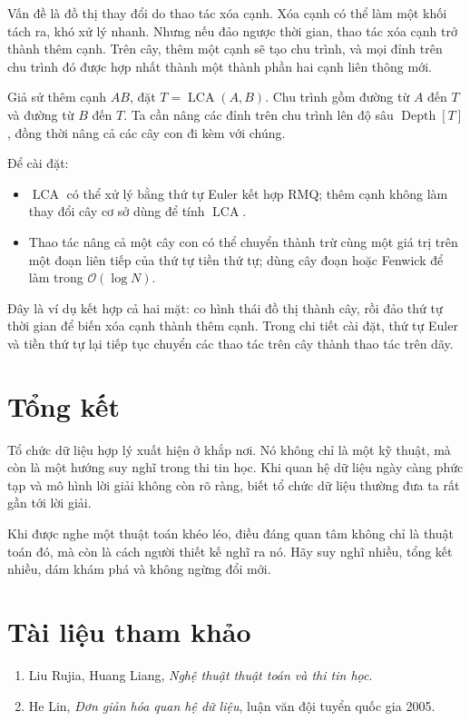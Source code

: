 \documentclass[11pt]{article}
\newcommand{\Oh}{\mathcal{O}}
\newcommand{\LCA}{\operatorname{LCA}}
\newcommand{\Depth}{\operatorname{Depth}}
\begin{document}
Vấn đề là đồ thị thay đổi do thao tác xóa cạnh. Xóa cạnh có thể làm một khối
tách ra, khó xử lý nhanh. Nhưng nếu đảo ngược thời gian, thao tác xóa cạnh
trở thành thêm cạnh. Trên cây, thêm một cạnh sẽ tạo chu trình, và mọi đỉnh trên
chu trình đó được hợp nhất thành một thành phần hai cạnh liên thông mới.

Giả sử thêm cạnh \(AB\), đặt \(T=\LCA(A,B)\). Chu trình gồm đường từ \(A\) đến
\(T\) và đường từ \(B\) đến \(T\). Ta cần nâng các đỉnh trên chu trình lên độ
sâu \(\Depth[T]\), đồng thời nâng cả các cây con đi kèm với chúng.

Để cài đặt:
\begin{itemize}
  \item \(\LCA\) có thể xử lý bằng thứ tự Euler kết hợp RMQ; thêm cạnh không
  làm thay đổi cây cơ sở dùng để tính \(\LCA\).
  \item Thao tác nâng cả một cây con có thể chuyển thành trừ cùng một giá trị
  trên một đoạn liên tiếp của thứ tự tiền thứ tự; dùng cây đoạn hoặc Fenwick để
  làm trong \(\Oh(\log N)\).
\end{itemize}

Đây là ví dụ kết hợp cả hai mặt: co hình thái đồ thị thành cây, rồi đảo thứ tự
thời gian để biến xóa cạnh thành thêm cạnh. Trong chi tiết cài đặt, thứ tự
Euler và tiền thứ tự lại tiếp tục chuyển các thao tác trên cây thành thao tác
trên dãy.

\section{Tổng kết}

Tổ chức dữ liệu hợp lý xuất hiện ở khắp nơi. Nó không chỉ là một kỹ thuật, mà
còn là một hướng suy nghĩ trong thi tin học. Khi quan hệ dữ liệu ngày càng
phức tạp và mô hình lời giải không còn rõ ràng, biết tổ chức dữ liệu thường
đưa ta rất gần tới lời giải.

Khi được nghe một thuật toán khéo léo, điều đáng quan tâm không chỉ là thuật
toán đó, mà còn là cách người thiết kế nghĩ ra nó. Hãy suy nghĩ nhiều, tổng
kết nhiều, dám khám phá và không ngừng đổi mới.

\section*{Tài liệu tham khảo}

\begin{enumerate}
  \item Liu Rujia, Huang Liang, \textit{Nghệ thuật thuật toán và thi tin học}.
  \item He Lin, \textit{Đơn giản hóa quan hệ dữ liệu}, luận văn đội tuyển quốc
  gia 2005.
\end{enumerate}
\end{document}
